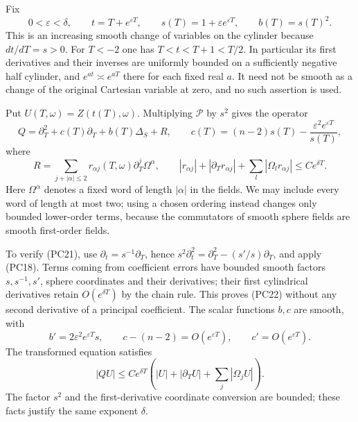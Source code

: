 \documentclass[
  11pt,
]{article}
\makeatletter
\let\ReaderOriginalAnchorStart\hyper@anchorstart
\let\ReaderOriginalAnchorEnd\hyper@anchorend
\let\ReaderPendingAliases\@empty
\def\ReaderArmAliases#1{\gdef\ReaderPendingAliases{#1}}
\def\hyper@anchorstart#1{\ReaderIfNativeAnchorTF{#1}{\ReaderPendingAliases\global\let\ReaderPendingAliases\@empty}{}\ReaderOriginalAnchorStart{#1}}
\makeatother
\begin{document}
Fix \[
0<\varepsilon<\delta,\qquad
t=T+e^{\varepsilon T},\qquad
s(T)=1+\varepsilon e^{\varepsilon T},\qquad
b(T)=s(T)^2.
\tag{PC20}
\] This is an increasing smooth change of variables on the cylinder
because \(dt/dT=s>0\). For \(T<-2\) one has \(T<t<T+1<T/2\). In
particular its first derivatives and their inverses are uniformly
bounded on a sufficiently negative half cylinder, and
\(e^{at}\asymp e^{aT}\) there for each fixed real \(a\). It need not be
smooth as a change of the original Cartesian variable at zero, and no
such assertion is used.

Put \(U(T,\omega)=Z(t(T),\omega)\). Multiplying \(\mathcal P\) by
\(s^2\) gives the operator \[
Q=\partial_T^2+c(T)\partial_T+b(T)\Delta_S+R,
\qquad
c(T)=(n-2)s(T)-\frac{\varepsilon^2e^{\varepsilon T}}{s(T)},
\tag{PC21}
\] where \[
R=\sum_{j+|\alpha|\leq2}r_{\alpha j}(T,\omega)
                  \partial_T^j\Omega^\alpha,
\qquad
|r_{\alpha j}|+|\partial_Tr_{\alpha j}|+
       \sum_l|\Omega_lr_{\alpha j}|\leq C e^{\delta T}.
\tag{PC22}
\] Here \(\Omega^\alpha\) denotes a fixed word of length \(|\alpha|\) in
the fields. We may include every word of length at most two; using a
chosen ordering instead changes only bounded lower-order terms, because
the commutators of smooth sphere fields are smooth first-order fields.

To verify (PC21), use \(\partial_t=s^{-1}\partial_T\), hence
\(s^2\partial_t^2=\partial_T^2-(s'/s)\partial_T\), and apply (PC18).
Terms coming from coefficient errors have bounded smooth factors
\(s,s^{-1},s'\), sphere coordinates and their derivatives; their first
cylindrical derivatives retain \(O(e^{\delta T})\) by the chain rule.
This proves (PC22) without any second derivative of a principal
coefficient. The scalar functions \(b,c\) are smooth, with \[
b'=2\varepsilon^2e^{\varepsilon T}s,\qquad
c-(n-2)=O(e^{\varepsilon T}),\qquad c'=O(e^{\varepsilon T}).
\tag{PC23}
\] The transformed equation satisfies \[
|QU|\leq C e^{\delta T}
 (|U|+|\partial_TU|+\sum_j|\Omega_jU|).
\tag{PC24}
\] The factor \(s^2\) and the first-derivative coordinate conversion are
bounded; these facts justify the same exponent \(\delta\).

\ReaderArmAliases{\ReaderOriginalAnchorStart{AN03-PCU-005}\ReaderOriginalAnchorEnd\begingroup\expandafter\def\csname @currentHref\endcsname{AN03-PCU-005}\label{AN03-PCU-005}\endgroup\ReaderOriginalAnchorStart{an03-pcu-005-a-coercive-pair-estimate-that-retains-order-two}\ReaderOriginalAnchorEnd\begingroup\expandafter\def\csname @currentHref\endcsname{an03-pcu-005-a-coercive-pair-estimate-that-retains-order-two}\label{an03-pcu-005-a-coercive-pair-estimate-that-retains-order-two}\endgroup\ReaderOriginalAnchorStart{5-a-coercive-pair-estimate-that-retains-order-two}\ReaderOriginalAnchorEnd\begingroup\expandafter\def\csname @currentHref\endcsname{5-a-coercive-pair-estimate-that-retains-order-two}\label{5-a-coercive-pair-estimate-that-retains-order-two}\endgroup\ReaderOriginalAnchorStart{a-coercive-pair-estimate-that-retains-order-two}\ReaderOriginalAnchorEnd}
\end{document}
